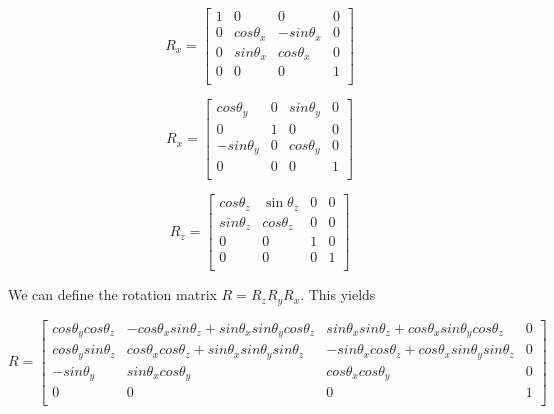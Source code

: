 \documentclass[titlepage,12pt]{report}
\begin{document}
\begin{equation}\label{rotx}
R_x = 
\begin{bmatrix}
1 & 0 & 0 & 0 \\
0 & cos\theta_x & -sin\theta_x & 0 \\
0 & sin\theta_x & cos\theta_x & 0 \\
0 & 0 & 0 & 1 \\
\end{bmatrix}
\end{equation}

\begin{equation}\label{roty}
R_x = 
\begin{bmatrix}
cos\theta_y & 0 & sin\theta_y & 0 \\
0 & 1 & 0 & 0 \\
-sin\theta_y  & 0 & cos\theta_y & 0 \\
0 & 0 & 0 & 1 \\
\end{bmatrix}
\end{equation}

\begin{equation}\label{rotz}
R_z = 
\begin{bmatrix}
cos\theta_z & \sin\theta_z & 0 & 0 \\
sin\theta_z & cos\theta_z & 0 & 0 \\
0 & 0 & 1 & 0 \\
0 & 0 & 0 & 1 \\
\end{bmatrix}
\end{equation}

We can define the rotation matrix $R = R_z R_y R_x$. This yields 

\begin{equation}\label{rot}
R = 
\begin{bmatrix}
cos\theta_y cos\theta_z 	& -cos\theta_x sin\theta_z + sin\theta_x sin\theta_y cos\theta_z & sin\theta_x sin\theta_z + cos\theta_x sin\theta_y cos\theta_z & 0 \\
cos\theta_y sin\theta_z 	& cos\theta_x cos\theta_z + sin\theta_x sin\theta_y sin\theta_z & -sin\theta_x cos\theta_z + cos\theta_x sin\theta_y sin\theta_z & 0 \\
-sin\theta_y 				& sin\theta_x cos\theta_y & cos\theta_x cos\theta_y & 0 \\
0 							& 0 & 0 & 1 \\
\end{bmatrix}
\end{equation}
\end{document}
